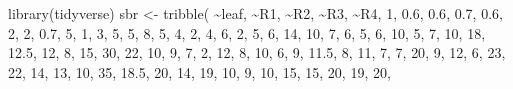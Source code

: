 \documentclass[
  letterpaper,
]{book}
\newenvironment{Shaded}{\begin{snugshade}}{\end{snugshade}}
\newcommand{\DecValTok}[1]{\textcolor[rgb]{0.68,0.00,0.00}{#1}}
\newcommand{\FloatTok}[1]{\textcolor[rgb]{0.68,0.00,0.00}{#1}}
\newcommand{\FunctionTok}[1]{\textcolor[rgb]{0.28,0.35,0.67}{#1}}
\newcommand{\NormalTok}[1]{\textcolor[rgb]{0.00,0.23,0.31}{#1}}
\newcommand{\OtherTok}[1]{\textcolor[rgb]{0.00,0.23,0.31}{#1}}
\newcommand{\SpecialCharTok}[1]{\textcolor[rgb]{0.37,0.37,0.37}{#1}}
\begin{document}
\begin{Shaded}
\begin{Highlighting}[]
\FunctionTok{library}\NormalTok{(tidyverse)}
\NormalTok{sbr }\OtherTok{\textless{}{-}} \FunctionTok{tribble}\NormalTok{(}
\SpecialCharTok{\textasciitilde{}}\NormalTok{leaf, }\SpecialCharTok{\textasciitilde{}}\NormalTok{R1, }\SpecialCharTok{\textasciitilde{}}\NormalTok{R2,  }\SpecialCharTok{\textasciitilde{}}\NormalTok{R3, }\SpecialCharTok{\textasciitilde{}}\NormalTok{R4,}
\DecValTok{1}\NormalTok{, }\FloatTok{0.6}\NormalTok{, }\FloatTok{0.6}\NormalTok{,  }\FloatTok{0.7}\NormalTok{, }\FloatTok{0.6}\NormalTok{,}
\DecValTok{2}\NormalTok{,   }\DecValTok{2}\NormalTok{, }\FloatTok{0.7}\NormalTok{,    }\DecValTok{5}\NormalTok{,   }\DecValTok{1}\NormalTok{,}
\DecValTok{3}\NormalTok{,   }\DecValTok{5}\NormalTok{,   }\DecValTok{5}\NormalTok{,    }\DecValTok{8}\NormalTok{,   }\DecValTok{5}\NormalTok{,}
\DecValTok{4}\NormalTok{,   }\DecValTok{2}\NormalTok{,   }\DecValTok{4}\NormalTok{,    }\DecValTok{6}\NormalTok{,   }\DecValTok{2}\NormalTok{,}
\DecValTok{5}\NormalTok{,   }\DecValTok{6}\NormalTok{,  }\DecValTok{14}\NormalTok{,   }\DecValTok{10}\NormalTok{,   }\DecValTok{7}\NormalTok{,}
\DecValTok{6}\NormalTok{,   }\DecValTok{5}\NormalTok{,   }\DecValTok{6}\NormalTok{,   }\DecValTok{10}\NormalTok{,   }\DecValTok{5}\NormalTok{,}
\DecValTok{7}\NormalTok{,  }\DecValTok{10}\NormalTok{,  }\DecValTok{18}\NormalTok{, }\FloatTok{12.5}\NormalTok{,  }\DecValTok{12}\NormalTok{,}
\DecValTok{8}\NormalTok{,  }\DecValTok{15}\NormalTok{,  }\DecValTok{30}\NormalTok{,   }\DecValTok{22}\NormalTok{,  }\DecValTok{10}\NormalTok{,}
\DecValTok{9}\NormalTok{,   }\DecValTok{7}\NormalTok{,   }\DecValTok{2}\NormalTok{,   }\DecValTok{12}\NormalTok{,   }\DecValTok{8}\NormalTok{,}
\DecValTok{10}\NormalTok{,  }\DecValTok{6}\NormalTok{,   }\DecValTok{9}\NormalTok{, }\FloatTok{11.5}\NormalTok{,   }\DecValTok{8}\NormalTok{,}
\DecValTok{11}\NormalTok{,  }\DecValTok{7}\NormalTok{,   }\DecValTok{7}\NormalTok{,   }\DecValTok{20}\NormalTok{,   }\DecValTok{9}\NormalTok{,}
\DecValTok{12}\NormalTok{,  }\DecValTok{6}\NormalTok{,  }\DecValTok{23}\NormalTok{,   }\DecValTok{22}\NormalTok{,  }\DecValTok{14}\NormalTok{,}
\DecValTok{13}\NormalTok{, }\DecValTok{10}\NormalTok{,  }\DecValTok{35}\NormalTok{, }\FloatTok{18.5}\NormalTok{,  }\DecValTok{20}\NormalTok{,}
\DecValTok{14}\NormalTok{, }\DecValTok{19}\NormalTok{,  }\DecValTok{10}\NormalTok{,    }\DecValTok{9}\NormalTok{,  }\DecValTok{10}\NormalTok{,}
\DecValTok{15}\NormalTok{, }\DecValTok{15}\NormalTok{,  }\DecValTok{20}\NormalTok{,   }\DecValTok{19}\NormalTok{,  }\DecValTok{20}\NormalTok{,}

\end{Highlighting}
\end{Shaded}
\end{document}
